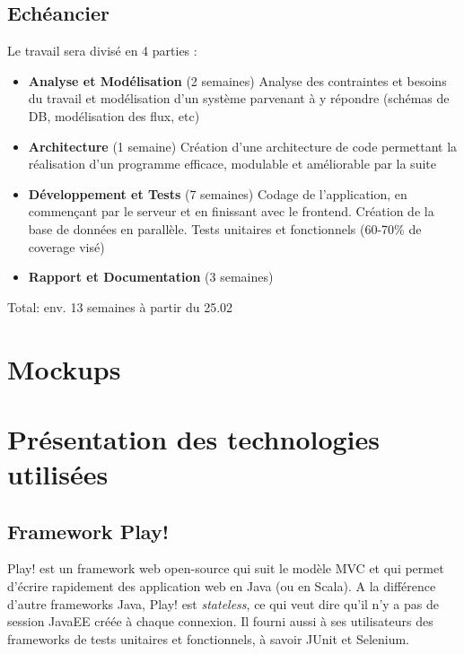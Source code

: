 \documentclass[french]{article}
\begin{document}
\subsection{Echéancier}

Le travail sera divisé en 4 parties :
\begin{itemize}
	\item \textbf{Analyse et Modélisation} (2 semaines) \newline
	Analyse des contraintes et besoins du travail et modélisation d'un système parvenant à y répondre (schémas de DB, modélisation des flux, etc)
	\item \textbf{Architecture} (1 semaine) \newline
	Création d'une architecture de code permettant la réalisation d'un programme efficace, modulable et améliorable par la suite
	\item \textbf{Développement et Tests} (7 semaines) \newline
	Codage de l'application, en commençant par le serveur et en finissant avec le frontend.  
	Création de la base de données en parallèle.
	Tests unitaires et fonctionnels (60-70\% de coverage visé)
	\item \textbf{Rapport et Documentation} (3 semaines) \newline
	\end{itemize}
	
Total: env. 13 semaines à partir du 25.02 \newpage

\section{Mockups}


\section{Présentation des technologies utilisées}

\subsection{Framework Play!}
Play! est un framework web open-source qui suit le modèle MVC et qui permet d'écrire rapidement des application web en Java (ou en Scala). A la différence d'autre frameworks Java, Play! est \textit{stateless}, ce qui veut dire qu'il n'y a pas de session JavaEE créée à chaque connexion. 
Il fourni aussi à ses utilisateurs des frameworks de tests unitaires et fonctionnels, à savoir JUnit et Selenium.
\end{document}
